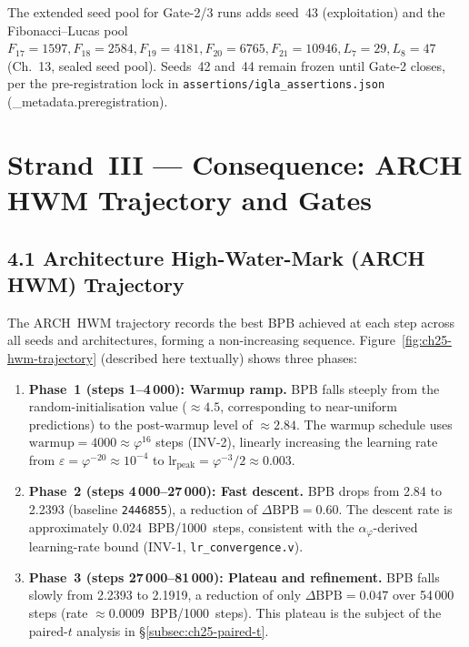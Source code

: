 The extended seed pool for Gate-2/3 runs adds seed~43 (exploitation)
and the Fibonacci–Lucas pool $F_{17}=1597, F_{18}=2584, F_{19}=4181,
F_{20}=6765, F_{21}=10946, L_7=29, L_8=47$
(Ch.~13, sealed seed pool).
Seeds~42 and~44 remain frozen until Gate-2 closes, per the
pre-registration lock in \texttt{assertions/igla\_assertions.json}
(\_metadata.preregistration).

\section{Strand~III — Consequence: ARCH HWM Trajectory and Gates}
\label{sec:ch25-consequence}

\subsection{4.1 Architecture High-Water-Mark (ARCH HWM) Trajectory}
\label{subsec:ch25-arch-hwm}

The ARCH~HWM trajectory records the best BPB achieved at each step
across all seeds and architectures, forming a non-increasing sequence.
Figure~\ref{fig:ch25-hwm-trajectory} (described here textually)
shows three phases:

\begin{enumerate}
  \item \textbf{Phase~1 (steps 1–4\,000): Warmup ramp.}
    BPB falls steeply from the random-initialisation value
    ($\approx 4.5$, corresponding to near-uniform predictions)
    to the post-warmup level of $\approx 2.84$.
    The warmup schedule uses $\mathrm{warmup}=4000\approx\varphi^{16}$ steps
    (INV-2), linearly increasing the learning rate from
    $\varepsilon = \varphi^{-20} \approx 10^{-4}$ to
    $\mathrm{lr}_{\mathrm{peak}} = \varphi^{-3}/2 \approx 0.003$.

  \item \textbf{Phase~2 (steps 4\,000–27\,000): Fast descent.}
    BPB drops from 2.84 to 2.2393 (baseline \texttt{2446855}),
    a reduction of $\Delta\mathrm{BPB} = 0.60$.
    The descent rate is approximately $0.024$~BPB/1000~steps,
    consistent with the $\alpha_\varphi$-derived learning-rate bound
    (INV-1, \texttt{lr\_convergence.v}).

  \item \textbf{Phase~3 (steps 27\,000–81\,000): Plateau and refinement.}
    BPB falls slowly from 2.2393 to 2.1919, a reduction of only
    $\Delta\mathrm{BPB} = 0.047$ over 54\,000 steps
    (rate $\approx 0.0009$~BPB/1000~steps).
    This plateau is the subject of the paired-$t$ analysis in
    §\ref{subsec:ch25-paired-t}.
\end{enumerate}

